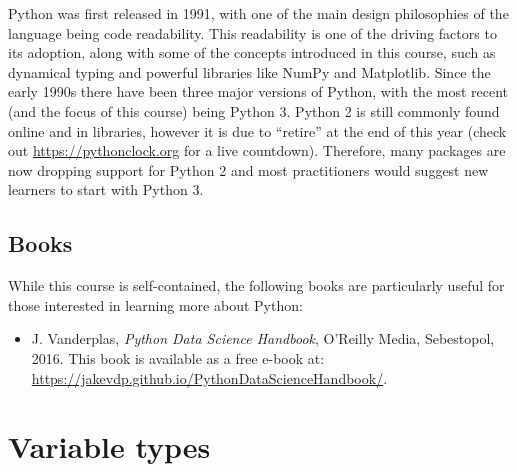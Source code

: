 \documentclass[a4paper]{article}
\begin{document}
Python was first released in 1991, with one of the main design philosophies of the language being code readability.
This readability is one of the driving factors to its adoption, along with some of the concepts introduced in this course, such as dynamical typing and powerful libraries like NumPy and Matplotlib.
Since the early 1990s there have been three major versions of Python, with the most recent (and the focus of this course) being Python 3.
Python 2 is still commonly found online and in libraries, however it is due to ``retire'' at the end of this year (check out \url{https://pythonclock.org} for a live countdown).
Therefore, many packages are now dropping support for Python 2 and most practitioners would suggest new learners to start with Python 3.

\subsection{Books}

While this course is self-contained, the following books are particularly useful for those interested in learning more about Python:
\begin{itemize}
	\item J. Vanderplas, \emph{Python Data Science Handbook}, O'Reilly Media, Sebestopol, 2016. This book is available as a free e-book at: \url{https://jakevdp.github.io/PythonDataScienceHandbook/}.
\end{itemize}

\section{Variable types}
\end{document}
